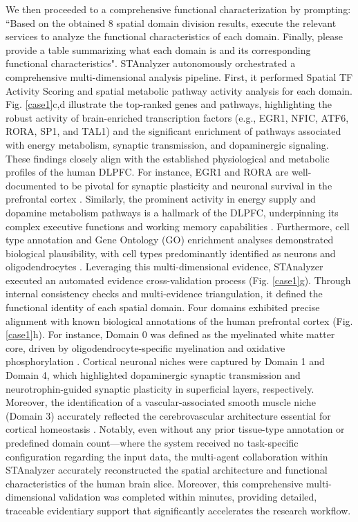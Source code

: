 \documentclass[11pt,a4paper]{article}
\begin{document}
We then proceeded to a comprehensive functional characterization by prompting: ``Based on the obtained 8 spatial domain division results, execute the relevant services to analyze the functional characteristics of each domain. Finally, please provide a table summarizing what each domain is and its corresponding functional characteristics". STAnalyzer autonomously orchestrated {a comprehensive multi-dimensional analysis pipeline}. First, it performed Spatial TF Activity Scoring and spatial metabolic pathway activity analysis for each domain. Fig. \ref{case1}c,d illustrate the top-ranked genes and pathways, highlighting the robust activity of brain-enriched transcription factors (e.g., EGR1, NFIC, ATF6, RORA, SP1, and TAL1) and the significant enrichment of pathways associated with energy metabolism, synaptic transmission, and dopaminergic signaling. These findings closely align with the established physiological and metabolic profiles of the human DLPFC. For instance, EGR1 and RORA are well-documented to be pivotal for synaptic plasticity and neuronal survival in the prefrontal cortex \cite{duclot2017role,sarachana2013genome}. Similarly, the prominent activity in energy supply and dopamine metabolism pathways is a hallmark of the DLPFC, underpinning its complex executive functions and working memory capabilities \cite{magistretti2015cellular,cools2011inverted}. Furthermore, cell type annotation and Gene Ontology (GO) enrichment analyses demonstrated biological plausibility, with cell types predominantly identified as neurons and oligodendrocytes \cite{maynard2021transcriptome}. Leveraging this multi-dimensional evidence, STAnalyzer executed an automated evidence cross-validation process (Fig. \ref{case1}g). Through internal consistency checks and multi-evidence triangulation, it defined the functional identity of each spatial domain. Four domains exhibited precise alignment with known biological annotations of the human prefrontal cortex (Fig. \ref{case1}h). For instance, Domain 0 was defined as the myelinated white matter core, driven by oligodendrocyte-specific myelination and oxidative phosphorylation \cite{stadelmann2019myelin}. Cortical neuronal niches were captured by Domain 1 and Domain 4, which highlighted dopaminergic synaptic transmission \cite{seamans2004principal} and neurotrophin-guided synaptic plasticity \cite{zeng2012large} in superficial layers, respectively. Moreover, the identification of a vascular-associated smooth muscle niche (Domain 3) accurately reflected the cerebrovascular architecture essential for cortical homeostasis \cite{iadecola2017neurovascular}. Notably, even without any prior tissue-type annotation or predefined domain count—where the system received no task-specific configuration regarding the input data, the multi-agent collaboration within STAnalyzer accurately reconstructed the spatial architecture and functional characteristics of the human brain slice. Moreover, this comprehensive multi-dimensional validation was completed within minutes, providing detailed, traceable evidentiary support that significantly accelerates the research workflow.
\end{document}
